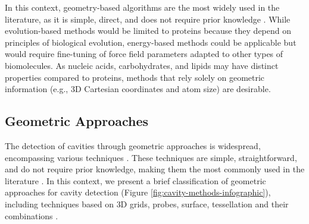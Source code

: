 \documentclass[Ingles]{phdthesis}
\begin{document}
In this context, geometry-based algorithms are the most widely used in the literature, as it is simple, direct, and does not require prior knowledge \cite{henrich2010,oliveira2014}. While evolution-based methods would be limited to proteins because they depend on principles of biological evolution, energy-based methods could be applicable but would require fine-tuning of force field parameters adapted to other types of biomolecules. As nucleic acids, carbohydrates, and lipids may have distinct properties compared to proteins, methods that rely solely on geometric information (e.g., \acs{3D} Cartesian coordinates and atom size) are desirable.

\subsection{Geometric Approaches \label{sec:geometric-approaches}}

The detection of cavities through geometric approaches is widespread, encompassing various techniques \cite{simoes2017,guerra2020}. These techniques are simple, straightforward, and do not require prior knowledge, making them the most commonly used in the literature \cite{henrich2010,oliveira2014}. In this context, we present a brief classification of geometric approaches for cavity detection (Figure \ref{fig:cavity-methods-infographic}), including techniques based on \ac{3D} grids, probes, surface, tessellation and their combinations \cite{simoes2017,guerra2020,guerra2023B}.
\end{document}
